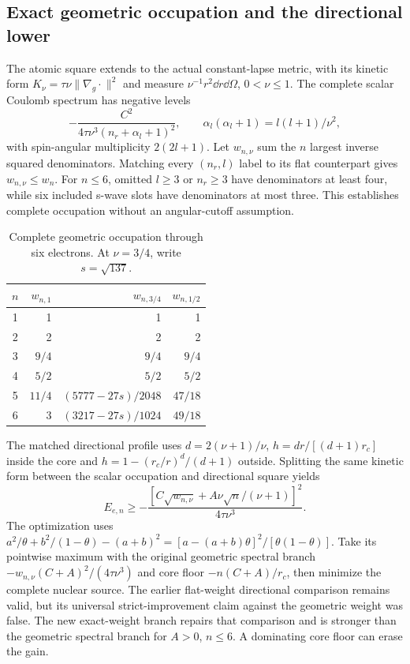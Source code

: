 \subsection{Exact geometric occupation and the directional lower}
\label{sec:geometry-12}

The atomic square extends to the actual constant-lapse metric, with its
kinetic form $K_\nu=\tau\nu\|\nabla_g\cdot\|^2$ and measure
$\nu^{-1}r^2\dd r\dd\Omega$, $0<\nu\le1$. The complete scalar Coulomb
spectrum has negative levels
\begin{equation}
 -\frac{C^2}{4\tau\nu^3(n_r+\alpha_l+1)^2},\qquad
 \alpha_l(\alpha_l+1)=l(l+1)/\nu^2,
\end{equation}
with spin-angular multiplicity $2(2l+1)$. Let $w_{n,\nu}$ sum the $n$
largest inverse squared denominators. Matching every $(n_r,l)$ label to
its flat counterpart gives $w_{n,\nu}\le w_n$. For $n\le6$, omitted
$l\ge3$ or $n_r\ge3$ have denominators at least four, while six included
s-wave slots have denominators at most three. This establishes complete
occupation without an angular-cutoff assumption.

\begin{table}[htbp]\centering\small
\caption{Complete geometric occupation through six electrons.
At $\nu=3/4$, write $s=\sqrt{137}$.}
\begin{tabular}{crrr}\toprule
$n$&$w_{n,1}$&$w_{n,3/4}$&$w_{n,1/2}$\\\midrule
1&1&1&1\\2&2&2&2\\3&$9/4$&$9/4$&$9/4$\\
4&$5/2$&$5/2$&$5/2$\\
5&$11/4$&$(5777-27s)/2048$&$47/18$\\
6&3&$(3217-27s)/1024$&$49/18$\\\bottomrule
\end{tabular}\label{tab:geometry-weights-12}
\end{table}

The matched directional profile uses
$d=2(\nu+1)/\nu$, $h=dr/[(d+1)r_c]$ inside the core and
$h=1-(r_c/r)^d/(d+1)$ outside. Splitting the same kinetic form between
the scalar occupation and directional square yields
\begin{equation}
 E_{e,n}\ge-
 \frac{[C\sqrt{w_{n,\nu}}+A\nu\sqrt n/(\nu+1)]^2}
      {4\tau\nu^3}.
\label{eq:geometry-directional-12}
\end{equation}
The optimization uses
$a^2/\theta+b^2/(1-\theta)-(a+b)^2
=[a-(a+b)\theta]^2/[\theta(1-\theta)]$.
Take its pointwise maximum with the original geometric spectral branch
$-w_{n,\nu}(C+A)^2/(4\tau\nu^3)$ and core floor $-n(C+A)/r_c$,
then minimize the complete nuclear source. The earlier flat-weight
directional comparison remains valid, but its universal strict-improvement
claim against the geometric weight was false. The new exact-weight branch
repairs that comparison and is stronger than the geometric spectral
branch for $A>0$, $n\le6$. A dominating core floor can erase the gain.

